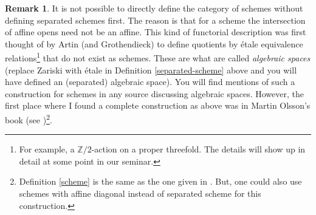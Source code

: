 \documentclass[11pt]{amsart}
\newcommand{\Z}{{\mathbb Z}}
\theoremstyle{definition}
\newtheorem{remark}[theorem]{Remark}
\begin{document}
\begin{remark}
	It is not possible to directly define the category of schemes without defining separated schemes first. The reason is that for a scheme the intersection of affine opens need not be an affine. This kind of functorial description was first thought of by Artin (and Grothendieck) to define quotients by \'{e}tale equivalence relations\footnote{For example, a $\Z/2$-action on a proper threefold. The details will show up in detail at some point in our seminar.} that do not exist as schemes. These are what are called \textit{algebraic spaces} (replace Zariski with \'{e}tale in Definition \ref{separated-scheme} above and you will have defined an (separated) algebraic space). You will find mentions of such a construction for schemes in any source discussing algebraic spaces. However, the first place where I found a complete construction as above was in Martin Olsson's book (see \cite{olsson16})\footnote{Definition \ref{scheme} is the same as the one given in \cite{olsson16}. But, one could also use schemes with affine diagonal instead of separated scheme for this construction.}.
\end{remark}


\newpage


\end{document}
